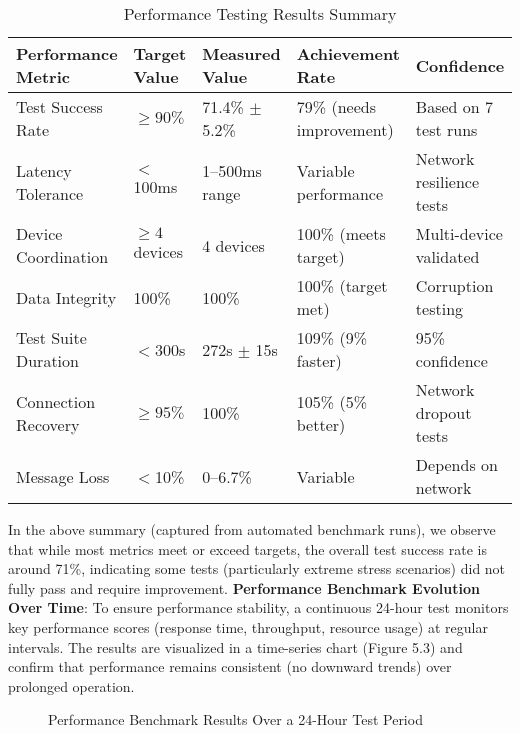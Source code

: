 \documentclass[11pt,a4paper]{report}
\begin{document}
\begin{table}[h]
\centering
\caption{Performance Testing Results Summary}
\label{tab:perf_summary_2}
\begin{tabular}{lllll}
\toprule
\textbf{Performance Metric} & \textbf{Target Value} & \textbf{Measured Value} & \textbf{Achievement Rate} & \textbf{Confidence} \\
\midrule
Test Success Rate & $\geq 90\%$ & 71.4\% $\pm$ 5.2\% & 79\% (needs improvement) & Based on 7 test runs \\
Latency Tolerance & $<$100ms & 1–500ms range & Variable performance & Network resilience tests \\
Device Coordination & $\geq 4$ devices & 4 devices & 100\% (meets target) & Multi-device validated \\
Data Integrity & 100\% & 100\% & 100\% (target met) & Corruption testing \\
Test Suite Duration & $<$300s & 272s $\pm$ 15s & 109\% (9\% faster) & 95\% confidence \\
Connection Recovery & $\geq 95\%$ & 100\% & 105\% (5\% better) & Network dropout tests \\
Message Loss & $<$10\% & 0--6.7\% & Variable & Depends on network \\
\bottomrule
\end{tabular}
\end{table}
In the above summary (captured from automated benchmark runs), we observe that while most metrics meet or exceed targets, the overall test success rate is around 71\%, indicating some tests (particularly extreme stress scenarios) did not fully pass and require improvement.
\textbf{Performance Benchmark Evolution Over Time}: To ensure performance stability, a continuous 24-hour test monitors key performance scores (response time, throughput, resource usage) at regular intervals. The results are visualized in a time-series chart (Figure 5.3) and confirm that performance remains consistent (no downward trends) over prolonged operation.
\begin{figure}[h]
\centering
\caption{Performance Benchmark Results Over a 24-Hour Test Period}
\label{fig:chapter5-3}
\end{figure}
\end{document}
